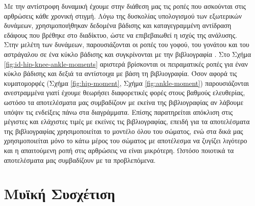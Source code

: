 Με την αντίστροφη δυναμική έχουμε στην διάθεση μας τις ροπές που ασκούνται στις αρθρώσεις κάθε χρονική στιγμή. Λόγω της δυσκολίας υπολογισμού των εξωτερικών δυνάμεων, χρησιμοποιήθηκαν δεδομένα βάδισης και καταγεγραμμένη αντίδραση εδάφους που βρέθηκε στο διαδίκτυο, ώστε να επιβεβαιωθεί η ισχύς της ανάλυσης. Στην μελέτη των δυνάμεων, παρουσιάζονται οι ροπές του γοφού, του γονάτου και του αστράγαλου σε ένα κύκλο βάδισης και συγκρίνονται με την βιβλιογραφία \cite{whittlesey}. Στο Σχήμα \ref{fig:id-hip-knee-ankle-moments} αριστερά βρίσκονται οι πειραματικές ροπές για έναν κύκλο βάδισης και δεξιά τα αντίστοιχα με βάση τη βιβλιογραφία. Όσον αφορά τις κυματομορφές (Σχήμα \ref{fig:hip-moment}, Σχήμα \ref{fig:ankle-moment}) παρουσιάζονται ανεστραμμένα  γιατί έχουμε θεωρήσει διαφορετικές φορές στους βαθμούς ελευθερίας, ωστόσο τα αποτελέσματα μας συμβαδίζουν με εκείνα της βιβλιογραφίας αν λάβουμε υπόψιν τις ενδείξεις πάνω στα διαγράμματα. Επίσης παρατηρείται απόκλιση στις μέγιστες και ελάχιστες τιμές με εκείνες τις βιβλιογραφίας, επειδή για τα αποτελέσματα της βιβλιογραφίας χρησιμοποιείται το μοντέλο όλου του σώματος, ενώ στα δικά μας χρησιμοποιείται μόνο το κάτω μέρος του σώματος με αποτέλεσμα να ζυγίζει λιγότερο και η απαιτούμενη ροπή στις αρθρώσεις να είναι μικρότερη. Ωστόσο ποιοτικά τα αποτελέσματα μας συμβαδίζουν με τα προβλεπόμενα.


\section{Μυϊκή Συσχέτιση}

